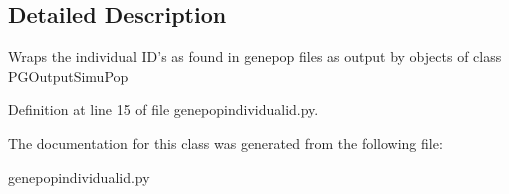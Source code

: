 \subsection{Detailed Description}
\begin{DoxyVerb}Wraps the individual ID's as found in genepop
files as output by objects of class PGOutputSimuPop
\end{DoxyVerb}
 

Definition at line 15 of file genepopindividualid.\+py.



The documentation for this class was generated from the following file\+:\begin{DoxyCompactItemize}
\item 
genepopindividualid.\+py\end{DoxyCompactItemize}
